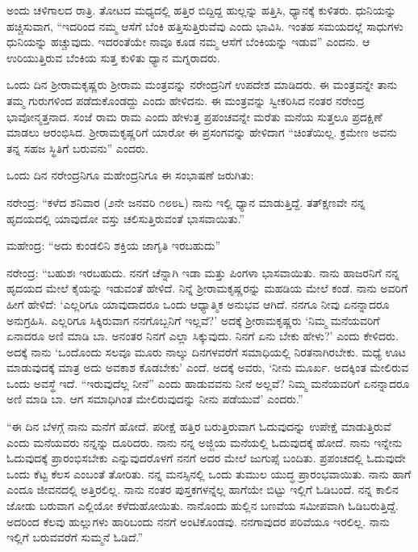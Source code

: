 ಅಂದು ಚಳಿಗಾಲದ ರಾತ್ರಿ. ತೋಟದ ಮಧ್ಯದಲ್ಲಿ ಹತ್ತಿರ ಬಿದ್ದಿದ್ದ ಹುಲ್ಲನ್ನು ಹತ್ತಿಸಿ, ಧ್ಯಾನಕ್ಕೆ ಕುಳಿತರು. ಧುನಿಯನ್ನು ಹಚ್ಚಿಸುವಾಗ, “ಇದರಿಂದ ನಮ್ಮ ಆಸೆಗೆ ಬೆಂಕಿ ಹತ್ತಿಸುತ್ತಿರುವೆವು ಎಂದು ಭಾವಿಸಿ. ಇಂತಹ ಸಮಯದಲ್ಲೆ ಸಾಧುಗಳು ಧುನಿಯನ್ನು ಹಚ್ಚುವುದು. ಇದರಂತೆಯೇ ನಾವೂ ಕೂಡ ನಮ್ಮ ಆಸೆಗೆ ಬೆಂಕಿಯನ್ನು ಇಡುವ” ಎಂದನು. ಆ ಉರಿಯುತ್ತಿರುವ ಬೆಂಕಿಯ ಸುತ್ತ ಕುಳಿತು ಧ್ಯಾನ ಮಗ್ನರಾದರು.

ಒಂದು ದಿನ ಶ‍್ರೀರಾಮಕೃಷ್ಣರು ಶ‍್ರೀರಾಮ ಮಂತ್ರವನ್ನು ನರೇಂದ್ರನಿಗೆ ಉಪದೇಶ ಮಾಡಿದರು. ಈ ಮಂತ್ರವನ್ನೇ ತಾನು ತಮ್ಮ ಗುರುಗಳಿಂದ ಪಡೆದುಕೊಂಡದ್ದು ಎಂದು ಹೇಳಿದನು. ಈ ಮಂತ್ರವನ್ನು ಸ್ವೀಕರಿಸಿದ ನಂತರ ನರೇಂದ್ರ ಭಾವೋನ್ಮತ್ತನಾದ. ಸಂಜೆ ರಾಮ ರಾಮ ಎಂದು ಹೇಳುತ್ತ ಪ್ರಪಂಚವನ್ನೇ ಮರೆತು ಮನೆಯ ಸುತ್ತಲೂ ಪ್ರದಕ್ಷಿಣೆ ಮಾಡಲು ಆರಂಭಿಸಿದ. ಶ‍್ರೀರಾಮಕೃಷ್ಣರಿಗೆ ಯಾರೋ ಈ ಪ್ರಸಂಗವನ್ನು ಹೇಳಿದಾಗ “ಚಿಂತೆಯಿಲ್ಲ. ಕ್ರಮೇಣ ಅವನು ತನ್ನ ಸಹಜ ಸ್ಥಿತಿಗೆ ಬರುವನು” ಎಂದರು.

ಒಂದು ದಿನ ನರೇಂದ್ರನಿಗೂ ಮಹೇಂದ್ರನಿಗೂ ಈ ಸಂಭಾಷಣೆ ಜರುಗಿತು:

ನರೇಂದ್ರ: “ಕಳೆದ ಶನಿವಾರ (೨ನೇ ಜನವರಿ ೧೮೮೬) ನಾನು ಇಲ್ಲಿ ಧ್ಯಾನ ಮಾಡುತ್ತಿದ್ದೆ. ತತ್‍ಕ್ಷಣವೇ ನನ್ನ ಹೃದಯದಲ್ಲಿ ಯಾವುದೋ ವಸ್ತು ಚಲಿಸುತ್ತಿರುವಂತೆ ಭಾಸವಾಯಿತು.”

ಮಹೇಂದ್ರ: “ಅದು ಕುಂಡಲಿನಿ ಶಕ್ತಿಯ ಜಾಗೃತಿ ಇರಬಹುದು”

ನರೇಂದ್ರ: “ಬಹುಶಃ ಇರಬಹುದು. ನನಗೆ ಚೆನ್ನಾಗಿ ಇಡಾ ಮತ್ತು ಪಿಂಗಳಾ ಭಾಸವಾಯಿತು. ನಾನು ಹಾಜರನಿಗೆ ನನ್ನ ಹೃದಯದ ಮೇಲೆ ಕೈಯನ್ನು ಇಡುವಂತೆ ಹೇಳಿದೆ. ನಿನ್ನೆ ಶ‍್ರೀರಾಮಕೃಷ್ಣರನ್ನು ಮಹಡಿಯ ಮೇಲೆ ಕಂಡೆ. ನಾನು ಅವರಿಗೆ ಹೀಗೆ ಹೇಳಿದೆ: ‘ಎಲ್ಲರಿಗೂ ಯಾವುದಾದರೂ ಒಂದು ಆಧ್ಯಾತ್ಮಿಕ ಅನುಭವ ಆಗಿದೆ. ನನಗೂ ನೀವು ಏನನ್ನಾದರೂ ಅನುಗ್ರಹಿಸಿ. ಎಲ್ಲರಿಗೂ ಸಿಕ್ಕಿರುವಾಗ ನನಗೊಬ್ಬನಿಗೆ ಇಲ್ಲವೆ?’ ಅದಕ್ಕೆ ಶ‍್ರೀರಾಮಕೃಷ್ಣರು ‘ನಿಮ್ಮ ಮನೆಯವರಿಗೆ ಏನಾದರೂ ಅಣಿ ಮಾಡಿ ಬಾ. ಅನಂತರ ನಿನಗೆ ಎಲ್ಲಾ ಸಿಕ್ಕುವುದು. ನಿನಗೆ ಏನು ಬೇಕು ಹೇಳು?’ ಎಂದು ಕೇಳಿದರು. ಅದಕ್ಕೆ ನಾನು ‘ಒಂದೊಂದು ಸಲವೂ ಮೂರು ನಾಲ್ಕು ದಿನಗಳವರೆಗೆ ಸಮಾಧಿಯಲ್ಲಿ ನಿರತನಾಗಿರಬೇಕು. ಮಧ್ಯೆ ಊಟ ಮಾಡುವುದಕ್ಕೆ ಮಾತ್ರ ಅದು ಅವಕಾಶ ಕೊಡಬೇಕು’ ಎಂದೆ. ಅದಕ್ಕೆ ಅವರು, ‘ನೀನು ಮೂರ್ಖ. ಅದಕ್ಕಿಂತ ಮೇಲಿರುವ ಒಂದು ಅವಸ್ಥೆ ಇದೆ. “ಇರುವುದೆಲ್ಲ ನೀನೆ” ಎಂದು ಹಾಡುವವನು ನೀನೆ ಅಲ್ಲವೆ? ನಿಮ್ಮ ಮನೆಯವರಿಗೆ ಏನನ್ನಾದರೂ ಅಣಿ ಮಾಡಿ ಬಾ. ಆಗ ಸಮಾಧಿಗಿಂತ ಮೇಲಿರುವುದನ್ನು ನೀನು ಪಡೆಯುವೆ’ ಎಂದರು.”

“ಈ ದಿನ ಬೆಳಗ್ಗೆ ನಾನು ಮನೆಗೆ ಹೋದೆ. ಪರೀಕ್ಷೆ ಹತ್ತಿರ ಬರುತ್ತಿರುವಾಗ ಓದುವುದನ್ನು ಉಪೇಕ್ಷೆ ಮಾಡುತ್ತಿರುವೆ ಎಂದು ಮನೆಯವರು ನನ್ನನ್ನು ದೂರಿದರು. ನಾನು ನನ್ನ ಅಜ್ಜಿಯ ಮನೆಯಲ್ಲಿ ಓದುವುದಕ್ಕೆ ಹೋದೆ. ನಾನು ಇನ್ನೇನು ಓದುವುದಕ್ಕೆ ಪ್ರಾರಂಭಿಸಬೇಕು ಎನ್ನುವುದರೊಳಗೆ ನನಗೆ ಅದರ ಮೇಲೆ ಜುಗುಪ್ಸೆ ಬಂದಿತು. ಪ್ರಪಂಚದಲ್ಲಿ ಓದುವುದೇ ಒಂದು ಕೆಟ್ಟ ಕೆಲಸ ಎಂಬಂತೆ ತೋರಿತು. ನನ್ನ ಮನಸ್ಸಿನಲ್ಲಿ ಒಂದು ತುಮುಲ ಯುದ್ಧ ಪ್ರಾರಂಭವಾಯಿತು. ನಾನು ಹಾಗೆ ಎಂದೂ ಜೀವನದಲ್ಲಿ ಅತ್ತಿರಲಿಲ್ಲ. ನಾನು ನಂತರ ಪುಸ್ತಕಗಳನ್ನೆಲ್ಲ ಹಾಗೆಯೇ ಬಿಟ್ಟು ಇಲ್ಲಿಗೆ ಓಡಿಬಂದೆ. ನನ್ನ ಕಾಲಿನ ಜೋಡು ಬರುವಾಗ ಎಲ್ಲಿಯೋ ಕಳೆದುಹೋಯಿತು. ನಾನೊಂದು ಹುಲ್ಲಿನ ಬಣವೆಯ ಸಮೀಪವಾಗಿ ಓಡಿಬರುತ್ತಿದ್ದೆ. ಅದರಿಂದ ಕೆಲವು ಹುಲ್ಲುಗಳು ಹಾರಿಬಂದು ನನಗೆ ಅಂಟಿಕೊಂಡವು. ನನಗಾವುದರ ಪರಿವೆಯೂ ಇರಲಿಲ್ಲ. ನಾನು ಇಲ್ಲಿಗೆ ಬರುವವರೆಗೆ ಸುಮ್ಮನೆ ಓಡಿದೆ.”

